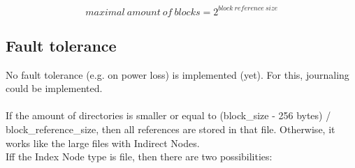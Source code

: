 \documentclass[JCDReport.tex]{subfiles}
\begin{document}
\begin{equation}
maximal\ amount\ of\ blocks = 2^{block\ reference\ size}
\end{equation}



\subsection{Fault tolerance}

No fault tolerance (e.g. on power loss) is implemented (yet). For this, journaling could be implemented.\\
\\







If the amount of directories is smaller or equal to (block\_size - 256 bytes) / block\_reference\_size, 
then all references are stored in that file. Otherwise, it works like the large files with Indirect Nodes.\\


Iff the Index Node type is file, then there are two possibilities:
\end{document}
